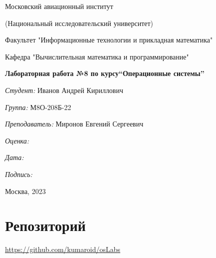 \documentclass[a4paper, 12pt]{article}
\begin{document}
\thispagestyle{empty}	
\begin{center}
	Московский авиационный институт
	
	(Национальный исследовательский университет)
	
	Факультет "Информационные технологии и прикладная математика"
	
	Кафедра "Вычислительная математика и программирование"
	
\end{center}
\vspace{40ex}
\begin{center}
	\textbf{\large{Лабораторная работа №8 по курсу\linebreak \textquotedblleft Операционные системы\textquotedblright}}
\end{center}
\vspace{35ex}
\begin{flushright}
	\textit{Студент: } Иванов Андрей Кириллович
	
	\vspace{2ex}
	\textit{Группа: } М8О-208Б-22
	
	\vspace{2ex}
	\textit{Преподаватель: } Миронов Евгений Сергеевич
	
	\vspace{2ex}
	\textit{Оценка: } \underline{\quad\quad\quad\quad\quad\quad}
	
	 \vspace{2ex}
	\textit{Дата: } \underline{\quad\quad\quad\quad\quad\quad}
	
	\vspace{2ex}
	\textit{Подпись: } \underline{\quad\quad\quad\quad\quad\quad}
	
\end{flushright}

\vspace{5ex}

\begin{vfill}
	\begin{center}
		Москва, 2023
	\end{center}	
\end{vfill}
\newpage


\begingroup
\color{black}
\tableofcontents\newpage
\endgroup

\section{Репозиторий}
\href{https://github.com/kumaroid/osLabs}{https://github.com/kumaroid/osLabs}
\end{document}
